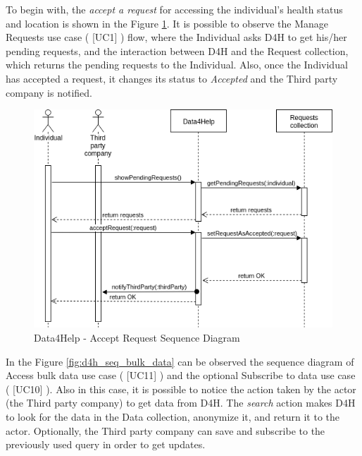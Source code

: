 \documentclass[hidelinks, 12pt]{report}
\newcommand\usecase[1]{ [UC#1] }
\begin{document}
To begin with, the \textit{accept a request} for accessing the individual's health status and location is shown in the Figure \ref{fig:d4h_seq_accept_request}. It is possible to observe the Manage Requests use case (\usecase{1}) flow, where the Individual asks D4H to get his/her pending requests, and the interaction between D4H and the Request collection, which returns the pending requests to the Individual. Also, once the Individual has accepted a request, it changes its status to \textit{Accepted} and the Third party company is notified. \\

\begin{figure}[H]
\centering
	\includegraphics[scale=0.6]{Diagrams/d4h_seq_accept_request.png}
\caption[Data4Help - Accept Request S7equence Diagram]{Data4Help - Accept Request Sequence Diagram}
\label{fig:d4h_seq_accept_request}
\end{figure}

In the Figure \ref{fig:d4h_seq_bulk_data} can be observed the sequence diagram of Access bulk data use case (\usecase{11}) and the optional Subscribe to data use case (\usecase{10}). Also in this case, it is possible to notice the action taken by the actor (the Third party company) to get data from D4H. The \textit{search} action makes D4H to look for the data in the Data collection, anonymize it, and return it to the actor. Optionally, the Third party company can save and subscribe to the previously used query in order to get updates.\\
\end{document}
